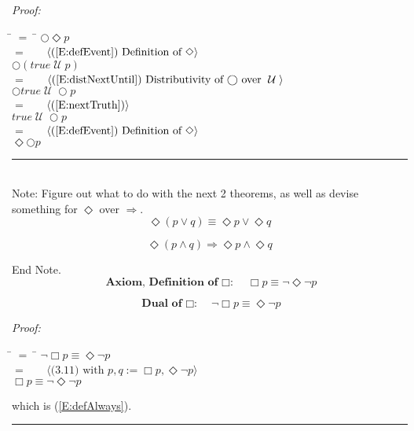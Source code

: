 \documentclass[fleqn, leqno]{article}
\newcommand{\lgap}{2pt}                             %
\newcommand{\mymathindent}{24pt}                      %
\newcommand{\myqed}{\hfill\rule[-.23ex]{1.2ex}{2.0ex}}
\newcommand{\until}{\;\mathcal{U}\;}
\newcommand{\Gll} {\langle}                         %
\newcommand{\Ggg} {\rangle}                         %
\newcommand{\Hint}[1]     {\ \ \ $\Gll              \mbox{#1} \Ggg$ }   %
\begin{document}
\emph{Proof:}
\begin{tabbing}
\hspace{\mymathindent} \= $= \;$ \= \kill
  \> \>   $\bigcirc\Diamond p$\\[\lgap]
  \> $=$  \>  \Hint{(\ref{E:defEvent}) Definition of $\Diamond$}\\[\lgap]
  \> \>   $\bigcirc(true \until p)$\\[\lgap]
  \> $=$  \>  \Hint{(\ref{E:distNextUntil}) Distributivity of $\bigcirc$ over $\until$}\\[\lgap]
  \> \>   $\bigcirc true \until \bigcirc p$\\[\lgap]
  \> $=$  \>  \Hint{(\ref{E:nextTruth})}\\[\lgap]
  \> \>   $true \until \bigcirc p$\\[\lgap]
  \> $=$  \>  \Hint{(\ref{E:defEvent}) Definition of $\Diamond$}\\[\lgap]
  \> \>   $\Diamond\bigcirc p$\\[\lgap]
\end{tabbing}
\myqed\\[\lgap]

Note: Figure out what to do with the next 2 theorems, as well as devise something for $\Diamond$ over $\Rightarrow$.\\

\begin{equation}\label{E:distEventOr}
\Diamond(p \lor q) \equiv \Diamond p \lor \Diamond q
\end{equation}

\begin{equation}\label{E:distEventAnd}
\Diamond(p \land q) \Rightarrow \Diamond p \land \Diamond q
\end{equation}

End Note.\\

\begin{equation}\label{E:defAlways}
\textbf{Axiom, Definition of $\Box$:}\quad \Box p \equiv \lnot\Diamond\lnot p
\end{equation}

\begin{equation}\label{E:dualAlways}
\textbf{Dual of $\Box$:}\quad \lnot\Box p \equiv \Diamond\lnot p
\end{equation}

\emph{Proof:}
\begin{tabbing}
\hspace{\mymathindent} \= $= \;$ \= \kill
  \> \>   $\lnot\Box p \equiv \Diamond\lnot p$\\[\lgap]
  \> $=$  \>  \Hint{(3.11) with $p,q := \Box p, \Diamond\lnot p$}\\[\lgap]
  \> \>   $\Box p \equiv \lnot\Diamond\lnot p$
\end{tabbing}
which is (\ref{E:defAlways}). \myqed\\[\lgap]
\end{document}
